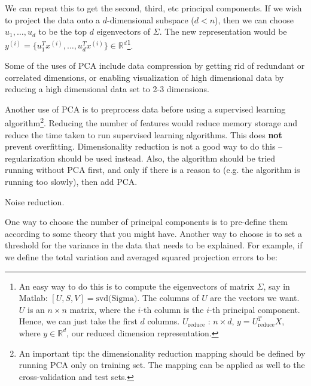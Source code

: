 \documentclass[letterpaper,10pt]{article}
\begin{document}
We can repeat this to get the second, third, etc principal components. If we wish to project the data onto a $d$-dimensional subspace ($d<n$), then we can choose $u_1,\ldots,u_d$ to be the top $d$ eigenvectors of $\Sigma$. The new representation would be $y^{(i)} = \{u^T_1 x^{(i)}, \ldots, u^T_d x^{(i)}\} \in \mathbb{R}^d$\footnote{
An easy way to do this is to compute the eigenvectors of matrix $\Sigma$, say in Matlab: $[U,S,V] = \text{svd(Sigma)}$. The columns of $U$ are the vectors we want. $U$ is an $n \times n$ matrix, where the $i$-th column is the $i$-th principal component. Hence, we can just take the first $d$ columns. $U_\text{reduce}$ : $n \times d$, $y = U_\text{reduce}^T X$, where $y \in \mathbb{R}^d$, our reduced dimension representation.
}.

Some of the uses of PCA include data compression by getting rid of redundant or correlated dimensions, or enabling visualization of high dimensional data by reducing a high dimensional data set to 2-3 dimensions. 

Another use of PCA is to preprocess data before using a supervised learning algorithm\footnote{An important tip: the dimensionality reduction mapping should be defined by running PCA only on training set. The mapping can be applied as well to the cross-validation and test sets.
}. Reducing the number of features would reduce memory storage and reduce the time taken to run supervised learning algorithms. This does \textbf{not} prevent overfitting. Dimensionality reduction is not a good way to do this -- regularization should be used instead. Also, the algorithm should be tried running without PCA first, and only if there is a reason to (e.g. the algorithm is running too slowly), then add PCA.


Noise reduction.

One way to choose the number of principal components is to pre-define them according to some theory that you might have. Another way to choose is to set a threshold for the variance in the data that needs to be explained. For example, if we define the total variation and averaged squared projection errors to be:
\end{document}
